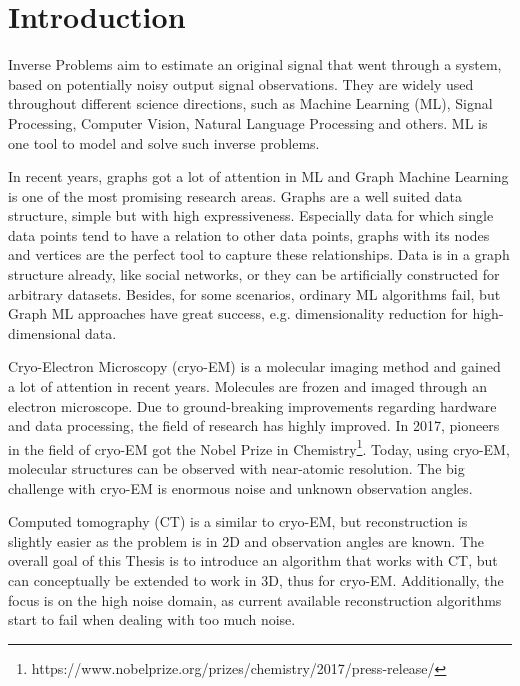 \chapter{Introduction}
\label{sec:introduction}

Inverse Problems aim to estimate an original signal that went through a system, 
based on potentially noisy output signal observations.
They are widely used throughout different science directions, such as Machine Learning (ML),
Signal Processing, Computer Vision, Natural Language Processing and others.
ML is one tool to model and solve such inverse problems.


\bigskip

In recent years, graphs got a lot of attention in ML and Graph Machine Learning is one of the most promising research areas.
Graphs are a well suited data structure, simple but with high expressiveness. 
Especially data for which single data points tend to have a relation to other data points, graphs with its nodes and vertices are the perfect tool
to capture these relationships. 
Data is in a graph structure already, like social networks, or they can be artificially constructed for arbitrary datasets.
Besides, for some scenarios, ordinary ML algorithms fail, but Graph ML approaches have great success, e.g. dimensionality reduction for high-dimensional data.


\bigskip

Cryo-Electron Microscopy (cryo-EM) is a molecular imaging method and gained a lot of attention in recent years. 
Molecules are frozen and imaged through an electron microscope.
Due to ground-breaking improvements regarding hardware and data processing, the field of research
has highly improved. In 2017, pioneers in the field of cryo-EM got the 
Nobel Prize in Chemistry\footnote{https://www.nobelprize.org/prizes/chemistry/2017/press-release/}.
Today, using cryo-EM, molecular structures can be observed with near-atomic resolution.
The big challenge with cryo-EM is enormous noise and unknown observation angles.

Computed tomography (CT) is a similar to cryo-EM, but reconstruction is slightly easier
as the problem is in 2D and observation angles are known.
The overall goal of this Thesis is to introduce an algorithm that works with CT, but 
can conceptually be extended to work in 3D, thus for cryo-EM. 
Additionally, the focus is on the high noise domain, as current available reconstruction algorithms
start to fail when dealing with too much noise.  

